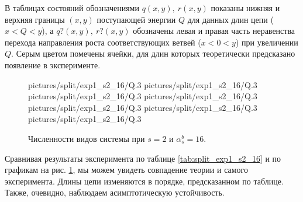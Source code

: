 В таблицах состояний обозначениями \(q(x,y), ~ r(x,y)\) показаны нижняя и верхняя границы \((x, y)\) поступающей энергии \(Q\) для данных длин цепи (\(x < Q < y\)), а \(q?(x,y), ~ r?(x,y)\) обозначены левая и правая часть неравенства перехода направления роста соответствующих ветвей (\(x < 0 < y\)) при увеличении \(Q\). Серым цветом помечены ячейки, для длин которых теоретически предсказано появление в эксперименте.

\begin{figure}[H]
    \centering
       {pictures/split/exp1_s2_16/Q}{.3}
      {pictures/split/exp1_s2_16/Q}{.3}
      {pictures/split/exp1_s2_16/Q}{.3}
      {pictures/split/exp1_s2_16/Q}{.3}
      {pictures/split/exp1_s2_16/Q}{.3}
      {pictures/split/exp1_s2_16/Q}{.3}
      {pictures/split/exp1_s2_16/Q}{.3}
\caption{Численности видов системы при \(s=2\) и \(\alpha^b_s = 16\).} \label{fig:split_exp1_s2_16}
\end{figure}
Сравнивая результаты эксперимента по таблице \ref{tab:split_exp1_s2_16} и по графикам на рис. \ref{fig:split_exp1_s2_16}, мы можем увидеть совпадение теории и самого эксперимента. Длины цепи изменяются в порядке, предсказанном по таблице. Также, очевидно, наблюдаем асимптотическую устойчивость.

